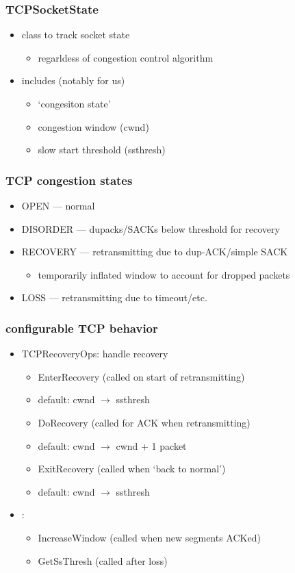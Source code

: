 \begin{frame}\frametitle{TCPSocketState}
\begin{itemize}
\item class to track socket state
    \begin{itemize}
    \item regarldess of congestion control algorithm
    \end{itemize}
\item includes (notably for us)
    \begin{itemize}
    \item `congesiton state'
    \item congestion window (cwnd)
    \item slow start threshold (ssthresh)
    \end{itemize}
\end{itemize}
\end{frame}

\begin{frame}\frametitle{TCP congestion states}
\begin{itemize}
\item OPEN --- normal
\item DISORDER --- dupacks/SACKs below threshold for recovery
\item RECOVERY --- retransmitting due to dup-ACK/simple SACK
    \begin{itemize}
    \item temporarily inflated window to account for dropped packets
    \end{itemize}
\item LOSS --- retransmitting due to timeout/etc.
\end{itemize}
\end{frame}

\begin{frame}\frametitle{configurable TCP behavior}
\begin{itemize}
\item TCPRecoveryOps: handle recovery
    \begin{itemize}
    \item EnterRecovery (called on start of retransmitting)
    \item default: cwnd $\rightarrow$ ssthresh
    \item DoRecovery (called for ACK when retransmitting)
    \item default: cwnd $\rightarrow$ cwnd + 1 packet
    \item ExitRecovery (called when `back to normal')
    \item default: cwnd $\rightarrow$ ssthresh
    \end{itemize}
\item {}:
    \begin{itemize}
    \item IncreaseWindow (called when new segments ACKed)
    \item GetSsThresh (called after loss)
    \end{itemize}
\end{itemize}
\end{frame}


